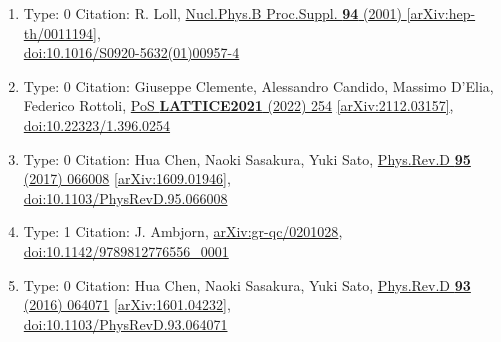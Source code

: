\documentclass[a4paper,10pt]{article}
\begin{document}
\begin{enumerate}
\begin{enumerate}
  \item Type: 0 Citation: R. Loll, \href{https://www.doi.org/10.1016/S0920-5632(01)00957-4}{Nucl.Phys.B Proc.Suppl. {\bf 94} (2001) }  \href{https://arxiv.org/abs/hep-th/0011194}{[arXiv:hep-th/0011194]},\\\href{https://www.doi.org/10.1016/S0920-5632(01)00957-4}{doi:10.1016/S0920-5632(01)00957-4}
  \item Type: 0 Citation: Giuseppe Clemente, Alessandro Candido, Massimo D'Elia, Federico Rottoli, \href{https://www.doi.org/10.22323/1.396.0254}{PoS {\bf LATTICE2021} (2022) 254}  \href{https://arxiv.org/abs/2112.03157}{[arXiv:2112.03157]},\\\href{https://www.doi.org/10.22323/1.396.0254}{doi:10.22323/1.396.0254}
  \item Type: 0 Citation: Hua Chen, Naoki Sasakura, Yuki Sato, \href{https://www.doi.org/10.1103/PhysRevD.95.066008}{Phys.Rev.D {\bf 95} (2017) 066008}  \href{https://arxiv.org/abs/1609.01946}{[arXiv:1609.01946]},\\\href{https://www.doi.org/10.1103/PhysRevD.95.066008}{doi:10.1103/PhysRevD.95.066008}
  \item Type: 1 Citation: J. Ambjorn, \href{https://arxiv.org/abs/gr-qc/0201028}{arXiv:gr-qc/0201028},\\\href{https://www.doi.org/10.1142/9789812776556_0001}{doi:10.1142/9789812776556\_0001}
  \item Type: 0 Citation: Hua Chen, Naoki Sasakura, Yuki Sato, \href{https://www.doi.org/10.1103/PhysRevD.93.064071}{Phys.Rev.D {\bf 93} (2016) 064071}  \href{https://arxiv.org/abs/1601.04232}{[arXiv:1601.04232]},\\\href{https://www.doi.org/10.1103/PhysRevD.93.064071}{doi:10.1103/PhysRevD.93.064071}

\end{enumerate}
\end{enumerate}
\end{document}
